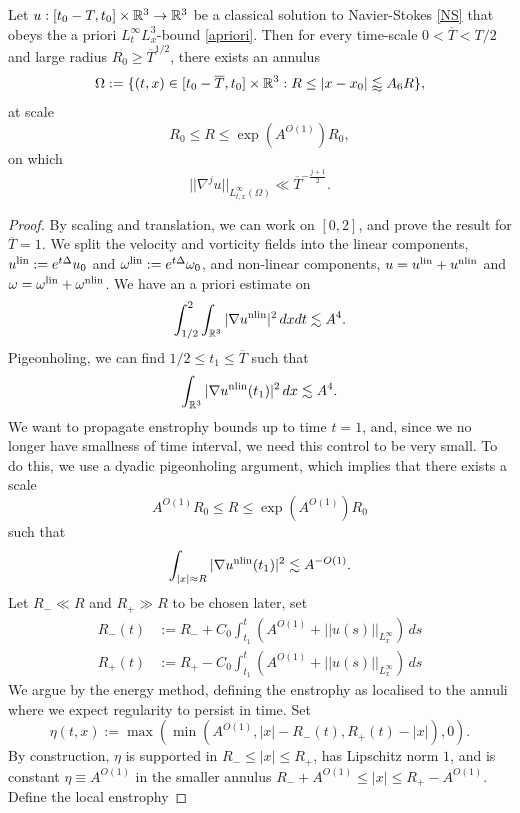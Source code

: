 \begin{proposition}
	Let $u : [t_0 - T, t_0] \times \mathbb R^3 \to \mathbb R^3$ be a classical solution to Navier-Stokes \eqref{NS}  that obeys the a priori $L^\infty_t L^3_x$-bound \eqref{apriori}. Then for every time-scale $0 < \overline T < T/2$ and large radius $R_0 \geq \overline T ^{1/2}$, there exists an annulus 
	\[
			\Omega 
				:= \{ (t, x) \in [t_0 - \overline T, t_0] \times \mathbb R^3 :  R \leq |x - x_0| \lessapprox A_6 R\},
	\]
	at scale
	\[
			 R_0 \leq R \leq \exp (A^{O(1)}) R_0,
	\]
	on which 	 
		\[
			||\nabla^j u ||_{L^\infty_{t, x} (\Omega)}\ll \overline T^{- \frac{j + 1}{2}}.
		\]	
\end{proposition}

\begin{proof}
	By scaling and translation, we can work on $[0, 2]$, and prove the result for $\overline T = 1$. We split the velocity and vorticity fields into the linear components, $u^{\mathrm{lin}} := e^{t \Delta} u_0$ and $\omega^{\mathrm{lin}} := e^{t \Delta} \omega_0$, and non-linear components, $u = u^{\mathrm{lin}} + u^{\mathrm{nlin}}$ and $\omega = \omega^{\mathrm{lin}} + \omega^{\mathrm{nlin}}$. We have an a priori estimate on 
		\[
			\int_{1/2}^2  \int_{\mathbb R^3} |\nabla u^{\mathrm{nlin}} |^2 \, dx dt \lesssim A^4.
		\]
	Pigeonholing, we can find $1/2 \leq t_1 \leq \overline T$ such that 	
		\[
			\int_{\mathbb R^3}  |\nabla u^{\mathrm{nlin}} (t_1)|^2 \, dx  \lesssim A^4. 
		\]
	We want to propagate enstrophy bounds up to time $t = 1$, and, since we no longer have smallness of time interval, we need this control to be very small. To do this, we use a dyadic pigeonholing argument, which implies that there exists a scale 
		\[
			A^{O(1)} R_0 \leq R \leq \exp(A^{O(1)}) R_0
		\]
	such that 
		\[
			\int_{|x| \approx R} |\nabla u^{\mathrm{nlin}} (t_1)|^2 \lesssim A^{-O(1)}. 
		\]	
	Let $R_- \ll R$ and $R_+ \gg R$ to be chosen later, set	
		\begin{align*}
			R_- (t)
				&:= R_- + C_0 \int_{t_1}^t ( A^{O(1)} + ||u (s)||_{L^\infty_x}) \, ds \\
			R_+ (t)
				&:= R_+ - C_0 \int_{t_1}^t ( A^{O(1)} + ||u (s)||_{L^\infty_x}) \, ds	
		\end{align*}
	We argue by the energy method, defining the enstrophy as localised to the annuli where we expect regularity to persist in time. Set
		\[
			\eta(t, x) := \max \left( \min(A^{O(1)} , |x| - R_- (t), R_+ (t) - |x|) , 0  \right).
		\]
	By construction, $\eta$ is supported in $R_- \leq |x| \leq R_+$, has Lipschitz norm $1$, and is constant $\eta \equiv A^{O(1)}$ in the smaller annulus $R_- + A^{O(1)} \leq |x| \leq R_+ - A^{O(1)}$. Define the local enstrophy

\end{proof}

